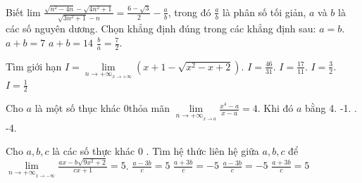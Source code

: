 \begin{ex}%
	Biết lim $\frac{\sqrt{n^2-4 n}-\sqrt{4 n^2+1}}{\sqrt{3 n^2+1}-n}=\frac{6-\sqrt{3}}{2}-\frac{a}{b}$, trong đó $\frac{a}{b}$ là phân số tối giản, $a$ và $b$ là các số nguyên dương. Chọn khẳng định đúng trong các khẳng định sau:
\choice
{ $a=b$.}
{ $a+b=7$}
{\True $a+b=14$}
{$\frac{b}{a}=\frac{7}{2}$.}
\end{ex}
\begin{ex}%
	Tìm giới hạn $I=\lim \limits_{n \to +\infty}_{x \rightarrow+\infty}\left(x+1-\sqrt{x^2-x+2}\right)$.
\choice
{$I=\frac{46}{31}$.}
{$I=\frac{17}{11}$.}
{\True $I=\frac{3}{2}$.}
{$I=\frac{1}{2}$}
\end{ex}
\begin{ex}%
	Cho $a$ là một số thục khác 0thỏa mãn $\lim \limits_{n \to +\infty}_{x \rightarrow a} \frac{x^4-a}{x-a}=4$.
	Khi đó $a$ bằng
\choice
{4.}
{-1.}
{.}
{-4.}
\end{ex}
\begin{ex}%
	Cho $a, b, c$ là các số thực khác 0 . Tìm hệ thức liên hệ giữa $a, b, c$ để $\lim \limits_{n \to +\infty}_{x \rightarrow-\infty} \frac{a x-b \sqrt{9 x^2+2}}{c x+1}=5$.
\choice
{$\frac{a-3 b}{c}=5$}
{$\frac{a+3 b}{c}=-5$}
{$\frac{a-3 b}{c}=-5$}
{\True $\frac{a+3 b}{c}=5$}
\end{ex}

